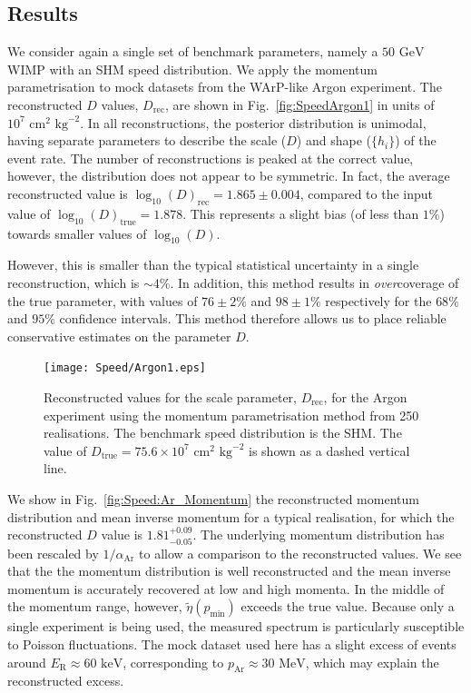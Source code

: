 \subsection{Results}

We consider again a single set of benchmark parameters, namely a \(50 \textrm{ GeV}\) WIMP with an SHM speed distribution. We apply the momentum parametrisation to mock datasets from the WArP-like Argon experiment. The reconstructed \(D\) values, \(D_\textrm{rec}\),  are shown in Fig.\ \ref{fig:SpeedArgon1} in units of \(10^7 \textrm{ cm}^2 \textrm{ kg}^{-2}\). In all reconstructions, the posterior distribution is unimodal, having separate parameters to describe the scale (\(D\)) and shape (\(\{h_i\}\)) of the event rate. The number of reconstructions is peaked at the correct value, however, the distribution does not appear to be symmetric. In fact, the average reconstructed value is \(\log_{10}(D)_\textrm{rec} = 1.865 \pm 0.004\), compared to the input value of \(\log_{10}(D)_\textrm{true} = 1.878\). This represents a slight bias (of less than \(1\%\)) towards smaller values of \(\log_{10}(D)\).

However, this is smaller than the typical statistical uncertainty in a single reconstruction, which is \(\sim 4\%\). In addition, this method results in \textit{over}coverage of the true parameter, with values of \(76 \pm 2 \%\) and \(98 \pm 1\%\) respectively for the \(68\%\) and \(95\%\) confidence intervals. This method therefore allows us to place reliable conservative estimates on the parameter \(D\).

\begin{figure}[t]
\centering
  \texttt{[image: Speed/Argon1.eps]}
  \caption[Distribution of the reconstructed scale parameter, $D_\textrm{rec}$, for the Argon experiment using the momentum parametrisation]{Reconstructed values for the scale parameter, \(D_\textrm{rec}\), for the Argon experiment using the momentum parametrisation method from 250 realisations. The benchmark speed distribution is the SHM. The value of \(D_\textrm{true} = 75.6 \times 10^7 \textrm{ cm}^2 \textrm{ kg}^{-2}\) is shown as a dashed vertical line.}
   \label{fig:SpeedSpeed:Argon1}
\end{figure}

We show in Fig.\ \ref{fig:Speed:Ar_Momentum} the reconstructed momentum distribution and mean inverse momentum for a typical realisation, for which the reconstructed \(D\) value is \(1.81_{-0.05}^{+0.09}\). The underlying momentum distribution has been rescaled by \(1/\alpha_\textrm{Ar}\) to allow a comparison to the reconstructed values. We see that the the momentum distribution is well reconstructed and the mean inverse momentum is accurately recovered at low and high momenta. In the middle of the momentum range, however, \(\tilde{\eta}(p_\textrm{min})\) exceeds the true value. Because only a single experiment is being used, the measured spectrum is particularly susceptible to Poisson fluctuations. The mock dataset used here has a slight excess of events around \(E_\textrm{R} \approx 60 \textrm{ keV}\), corresponding to \(p_\textrm{Ar} \approx 30 \textrm{ MeV}\), which may explain the reconstructed excess. 

